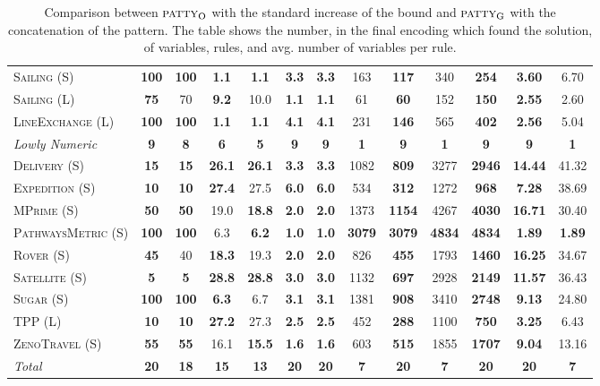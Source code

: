 \documentclass[11pt]{article}
\begin{document}
\begin{table}[tb]
{\begin{tabular}{|l||cc||cc||cc||cc||cc||cc||}
\textsc{Sailing} (S)&\textbf{100}&\textbf{100}&\textbf{1.1}&\textbf{1.1}&\textbf{3.3}&\textbf{3.3}&163&\textbf{117}&340&\textbf{254}&\textbf{3.60}&6.70\\
\textsc{Sailing} (L)&\textbf{75}&70&\textbf{9.2}&10.0&\textbf{1.1}&\textbf{1.1}&61&\textbf{60}&152&\textbf{150}&\textbf{2.55}&2.60\\
\textsc{LineExchange} (L)&\textbf{100}&\textbf{100}&\textbf{1.1}&\textbf{1.1}&\textbf{4.1}&\textbf{4.1}&231&\textbf{146}&565&\textbf{402}&\textbf{2.56}&5.04
\\\hline
\textit{Lowly Numeric}&\textbf{9}&\textbf{8}&\textbf{6}&\textbf{5}&\textbf{9}&\textbf{9}&\textbf{1}&\textbf{9}&\textbf{1}&\textbf{9}&\textbf{9}&\textbf{1}\\\hline
\textsc{Delivery} (S)&\textbf{15}&\textbf{15}&\textbf{26.1}&\textbf{26.1}&\textbf{3.3}&\textbf{3.3}&1082&\textbf{809}&3277&\textbf{2946}&\textbf{14.44}&41.32\\
\textsc{Expedition} (S)&\textbf{10}&\textbf{10}&\textbf{27.4}&27.5&\textbf{6.0}&\textbf{6.0}&534&\textbf{312}&1272&\textbf{968}&\textbf{7.28}&38.69\\
\textsc{MPrime} (S)&\textbf{50}&\textbf{50}&19.0&\textbf{18.8}&\textbf{2.0}&\textbf{2.0}&1373&\textbf{1154}&4267&\textbf{4030}&\textbf{16.71}&30.40\\
\textsc{PathwaysMetric} (S)&\textbf{100}&\textbf{100}&6.3&\textbf{6.2}&\textbf{1.0}&\textbf{1.0}&\textbf{3079}&\textbf{3079}&\textbf{4834}&\textbf{4834}&\textbf{1.89}&\textbf{1.89}\\
\textsc{Rover} (S)&\textbf{45}&40&\textbf{18.3}&19.3&\textbf{2.0}&\textbf{2.0}&826&\textbf{455}&1793&\textbf{1460}&\textbf{16.25}&34.67\\
\textsc{Satellite} (S)&\textbf{5}&\textbf{5}&\textbf{28.8}&\textbf{28.8}&\textbf{3.0}&\textbf{3.0}&1132&\textbf{697}&2928&\textbf{2149}&\textbf{11.57}&36.43\\
\textsc{Sugar} (S)&\textbf{100}&\textbf{100}&\textbf{6.3}&6.7&\textbf{3.1}&\textbf{3.1}&1381&\textbf{908}&3410&\textbf{2748}&\textbf{9.13}&24.80\\
\textsc{TPP} (L)&\textbf{10}&\textbf{10}&\textbf{27.2}&27.3&\textbf{2.5}&\textbf{2.5}&452&\textbf{288}&1100&\textbf{750}&\textbf{3.25}&6.43\\
\textsc{ZenoTravel} (S)&\textbf{55}&\textbf{55}&16.1&\textbf{15.5}&\textbf{1.6}&\textbf{1.6}&603&\textbf{515}&1855&\textbf{1707}&\textbf{9.04}&13.16
\\\hline
\textit{Total}&\textbf{20}&\textbf{18}&\textbf{15}&\textbf{13}&\textbf{20}&\textbf{20}&\textbf{7}&\textbf{20}&\textbf{7}&\textbf{20}&\textbf{20}&\textbf{7}\\\hline

        \end{tabular}}
        \caption{Comparison between $\textsc{patty}_\mathrm{O}$ with the standard increase of the bound and $\textsc{patty}_\mathrm{G}$ with the concatenation of the pattern. The table shows the number, in the final encoding which found the solution, of variables, rules, and avg. number of variables per rule. }
        \label{tab:exp-search}
        \end{table}
        
\end{document}
